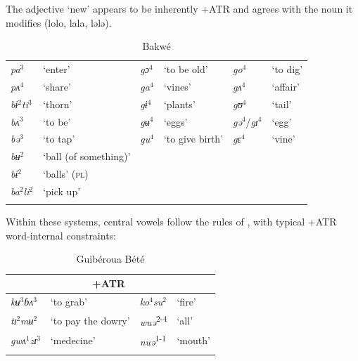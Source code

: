 \documentclass[output=paper,newtxmath,modfonts,nonflat,draft]{langsci/langscibook}
\begin{document}
The adjective ‘new’ appears to be inherently +ATR and agrees with the noun it modifies (lolo, lala, lələ).

\begin{table}
\caption{Bakwé \citep{centredetraduction2006}}
\label{tab:zogbo:7}
\begin{tabular}{llllll}
\lsptoprule
\textit{pa}$^3$ &   ‘enter’  &  \textit{gɔ}$^4$    & ‘to be old’ &  \textit{go}$^4$ &    ‘to dig’\\

\textit{pʌ}$^4$  &   ‘share’    & \textit{ga}$^4$ &   ‘vines’     & \textit{gʌ}$^4$ &    ‘affair’\\

\textit{bɨ}$^2$\textit{ti}$^3$ & ‘thorn’ &    \textit{gɨ}$^4$ &   ‘plants’  & \textit{gʊ}$^4$ &    ‘tail’\\

\textit{bʌ}$^3$ & ‘to be’ &    \textit{gʉ}$^4$ &   ‘eggs’  &   \textit{gə}$^4$/\textit{gɪ}$^4$ & ‘egg’\\

\textit{bə}$^3$ & ‘to tap’ &    \textit{gu}$^4$   & ‘to give birth’ &  \textit{gɛ}$^4$  &   ‘vine’\\

\textit{bʉ}$^2$ & ‘ball (of something)’\\

\textit{bɨ}$^2$ & ‘balls’ (\textsc{pl})\\

\textit{ba}$^2$\textit{li}$^2$ & ‘pick up’\\
\lspbottomrule
\end{tabular}
\end{table}

Within these systems, central vowels follow the rules of , with typical +ATR word-internal constraints:   

 

\begin{table}
\caption{Guibéroua Bété \citep{Werle1976}}
\label{tab:zogbo:8}
\begin{tabular}{llll}
\lsptoprule
\multicolumn{2}{c}{−ATR} & \multicolumn{2}{c}{+ATR}\\
\midrule
\textit{kʉ}$^3$\textit{ɓʌ}$^3$ &  ‘to grab’ &      \textit{ko}$^4$\textit{su}$^2$ &   ‘fire’\\

\textit{tɪ}$^2$\textit{mʉ}$^2$ & ‘to pay the dowry’  &  \textit{wuə}\textsuperscript{2-4} & ‘all’\\

\textit{gwʌ}$^1$\textit{zɪ}$^3$ &  ‘medecine’      & \textit{nuə}\textsuperscript{1-1}  &   ‘mouth’\\
\lspbottomrule
\end{tabular}
\end{table}
\end{document}
